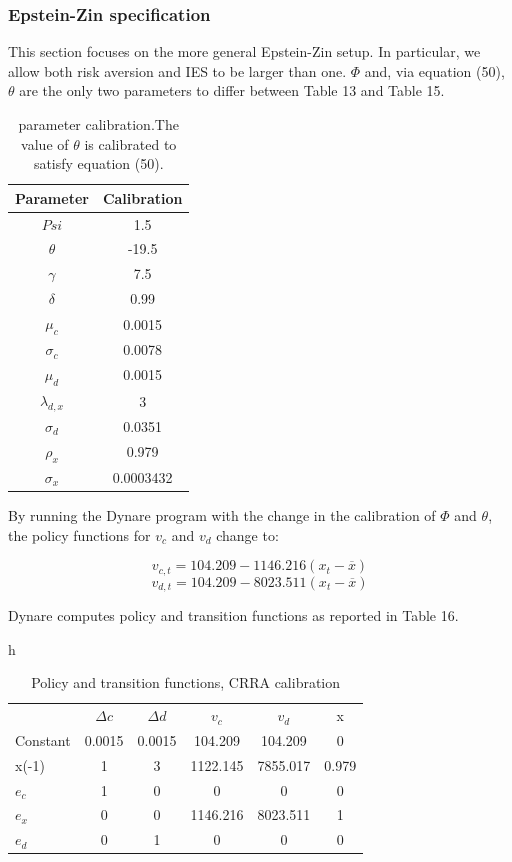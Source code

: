 \documentclass[a4paper,12pt]{scrartcl} %
\begin{document}
\subsubsection{Epstein-Zin specification}

This section focuses on the more general Epstein-Zin setup. In particular, we allow both risk aversion and IES to be larger than one. $\Phi$	 and, via equation (50), $\theta$ are the only two parameters to differ between Table 13 and Table 15.

\begin{table}[h]
\centering\caption{parameter calibration.The value of $\theta$ is calibrated to satisfy equation (50).}\label{15}
\begin{tabular}{cc}
  \hline
  Parameter&Calibration\\
  \hline
  $Psi$&1.5\\
  $\theta$&-19.5\\
  $\gamma$&7.5\\
  $\delta$&0.99\\
  $\mu_c$&0.0015\\
  $\sigma_c$&0.0078\\
  $\mu_d$&0.0015\\
  $\lambda_{d,x}$&3\\
  $\sigma_d$&0.0351\\
  $\rho_x$&0.979\\
  $\sigma_x$&0.0003432\\
  \hline
  \end{tabular}
\end{table}

\vspace{3cm}

By running the Dynare program with the change in the calibration of $\Phi$	 and $\theta$, the policy functions for $v_c$ and $v_d$ change to:

$$v_{c,t}=104.209-1146.216(x_t-\overline{x})$$
$$v_{d,t}=104.209-8023.511(x_t-\overline{x})$$

Dynare computes policy and transition functions as reported in Table 16.

\begin{table}{h}
\centering
\caption{Policy and transition functions, CRRA calibration}\label{16}
\begin{tabular}{lccccc}
\hline
&$\Delta c$&$\Delta d$&$v_c$&$v_d$&x\\
Constant&0.0015&0.0015&104.209&104.209&0\\
x(-1)&1&3&1122.145&7855.017&0.979\\
$e_c$&1&0&0&0&0\\
$e_x$&0&0&1146.216&8023.511&1\\
$e_d$&0&1&0&0&0\\
\hline
\end{tabular}
\end{table}
\end{document}
